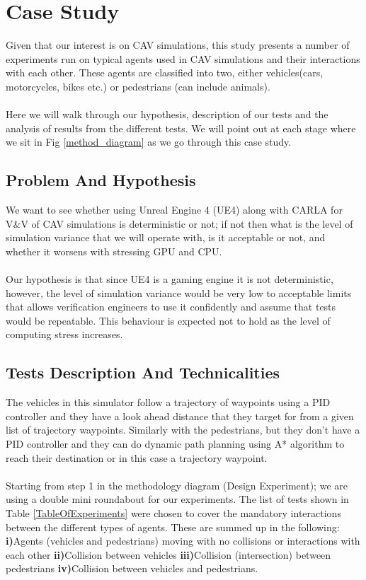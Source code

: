 \section{Case Study} \label{CaseStudy}
\noindent Given that our interest is on CAV simulations, this study presents a number of experiments run on typical agents used in CAV simulations and their interactions with each other. These agents are classified into two, either vehicles(cars, motorcycles, bikes etc.) or pedestrians (can include animals). \\\\
Here we will walk through our hypothesis, description of our tests and the analysis of results from the different tests. We will point out at each stage where we sit in Fig \ref{method_diagram} as we go through this case study.    

\subsection{Problem And Hypothesis}
\noindent We want to see whether using Unreal Engine 4 (UE4) along with CARLA \cite{CARLA_paper} for V\&V of CAV simulations is deterministic or not; if not then what is the level of simulation variance that we will operate with, is it acceptable or not, and whether it worsens with stressing GPU and CPU.\\\\
Our hypothesis is that since UE4 is a gaming engine it is not deterministic, however, the level of simulation variance would be very low to acceptable limits that allows verification engineers to use it confidently and assume that tests would be repeatable.
This behaviour is expected not to hold as the level of computing stress increases.     

\subsection{Tests Description And Technicalities}\label{TestsDescriptionAndTechnicalities}
\noindent The vehicles in this simulator follow a trajectory of waypoints using a PID controller and they have a look ahead distance that they target for from a given list of trajectory waypoints. 
Similarly with the pedestrians, but they don't have a PID controller and they can do dynamic path planning using A* algorithm to reach their destination or in this case a trajectory waypoint.\\\\ 
\noindent Starting from step 1 in the methodology diagram (Design Experiment); we are using a double mini roundabout for our experiments. 
The list of tests shown in Table \ref{TableOfExperiments} were chosen to cover the mandatory interactions between the different types of agents. 
These are summed up in the following: \textbf{i)}Agents (vehicles and pedestrians) moving with no collisions or interactions with each other \textbf{ii)}Collision between vehicles \textbf{iii)}Collision (intersection) between pedestrians \textbf{iv)}Collision between vehicles and pedestrians.


